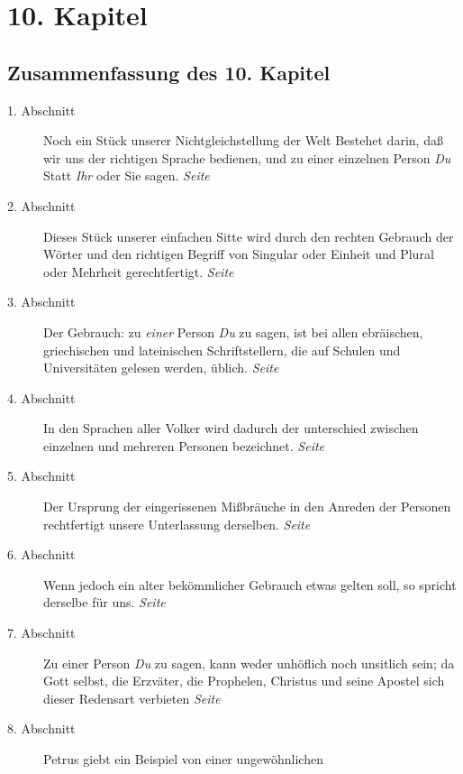 
\chapter{10. Kapitel} \label{kap10}
\section{Zusammenfassung des 10. Kapitel}


\begin{description}
\item[1. Abschnitt] Noch ein Stück unserer Nichtgleichstellung der Welt Bestehet
darin, daß wir uns der richtigen Sprache bedienen, und zu einer einzelnen Person
\textit{Du} Statt \textit{Ihr} oder Sie sagen.
\dotfill \textit{Seite~\pageref{kap10_ab1}}\\
\item[2. Abschnitt] Dieses Stück unserer einfachen Sitte wird durch den rechten
Gebrauch der Wörter und den richtigen Begriff von Singular oder Einheit und
Plural oder Mehrheit gerechtfertigt.
\dotfill \textit{Seite~\pageref{kap10_ab2}}\\
\item[3. Abschnitt] Der Gebrauch: zu \textit{einer} Person \textit{Du} zu sagen,
ist bei
allen ebräischen, griechischen und lateinischen Schriftstellern, die auf
Schulen und Universitäten gelesen werden, üblich.
\dotfill \textit{Seite~\pageref{kap10_ab3}}\\
\item[4. Abschnitt] In den Sprachen aller Volker wird dadurch der unterschied
zwischen einzelnen und mehreren Personen bezeichnet.
\dotfill \textit{Seite~\pageref{kap10_ab4}}\\
\item[5. Abschnitt] Der Ursprung der eingerissenen Mißbräuche in den Anreden der
Personen rechtfertigt unsere Unterlassung derselben.
\dotfill \textit{Seite~\pageref{kap10_ab5}}\\
\item[6. Abschnitt] Wenn jedoch ein alter bekömmlicher Gebrauch etwas gelten
soll, so spricht derselbe für uns.
\dotfill \textit{Seite~\pageref{kap10_ab6}}\\
\item[7. Abschnitt] Zu einer Person \textit{Du} zu sagen, kann weder unhöflich
noch
unsitlich sein; da Gott selbst, die Erzväter, die Prophelen, Christus und
seine Apostel sich dieser Redensart verbieten
\dotfill \textit{Seite~\pageref{kap10_ab7}}\\
\item[8. Abschnitt] Petrus giebt ein Beispiel von einer ungewöhnlichen

\end{description}
